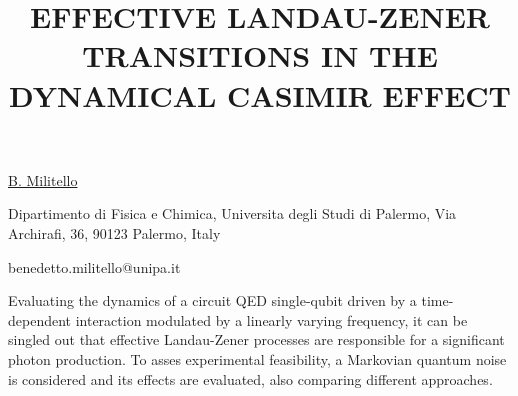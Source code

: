 \title{EFFECTIVE LANDAU-ZENER TRANSITIONS IN THE DYNAMICAL CASIMIR EFFECT}

\underline{B. Militello} 

{\normalsize{\vspace{-4mm}
Dipartimento di Fisica e Chimica,
Universita degli Studi di Palermo,
Via Archirafi, 36,
90123 Palermo, Italy

\email benedetto.militello@unipa.it}}

Evaluating the dynamics of a circuit QED single-qubit driven by a time-dependent interaction modulated by a linearly varying frequency, it can be singled out that effective Landau-Zener processes are responsible for a significant photon production. To asses experimental feasibility, a Markovian quantum noise is considered and its effects are evaluated, also comparing different approaches.

\vspace{\baselineskip} 